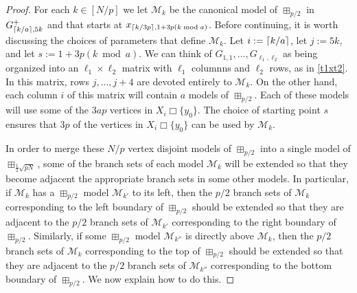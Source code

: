 \documentclass[12pt]{article}
\newcommand{\boxprod}{\mathbin{\Box}}
\DeclarePairedDelimiter{\ceil}{\lceil}{\rceil}
\renewcommand{\emptyset}{\varnothing}
\renewcommand{\le}{\leqslant}
\theoremstyle{plain}
\theoremstyle{definition}
\begin{document}
\begin{proof}
  For each $k\in[N/p]$ we let $\mathcal{M}_k$ be the canonical model of $\boxplus_{p/2}$ in $G_{\ceil{k/a},5k}^+$ and that starts at $x_{\ceil{k/3p},1+3p(k\bmod a)}$.  Before continuing, it is worth discussing the choices of parameters that define $\mathcal{M}_k$.  Let $i:=\ceil{k/a}$, let $j:=5k$, and let $s:=1+3p(k\bmod a)$.  We can think of $G_{1,1},\ldots,G_{\ell_1,\ell_2}$ as being organized into an $\ell_1\times \ell_2$ matrix with $\ell_1$ columnns and $\ell_2$ rows, as in \cref{t1xt2}.  In this matrix, rows $j,\ldots,j+4$ are devoted entirely to $\mathcal{M}_{k}$.  On the other hand, each column $i$ of this matrix will contain $a$ models of $\boxplus_{p/2}$.  Each of these models will use some of the $3ap$ vertices in $X_i\boxprod\{y_0\}$.  The choice of starting point $s$ ensures that $3p$ of the vertices in $X_i\boxprod\{y_0\}$ can be used by $\mathcal{M}_k$.


  In order to merge these $N/p$ vertex disjoint models of $\boxplus_{p/2}$ into a single model of $\boxplus_{\tfrac 12\sqrt{pN}}$, some of the branch sets of each model $\mathcal{M}_k$ will be extended so that they become adjacent the appropriate branch sets in some other models.  In particular, if $\mathcal{M}_k$ has a $\boxplus_{p/2}$ model $\mathcal{M}_{k'}$ to its left, then the $p/2$ branch sets of $\mathcal{M}_k$ corresponding to the left boundary of $\boxplus_{p/2}$ should be extended so that they are adjacent to the $p/2$ branch sets of $\mathcal{M}_{k'}$ corresponding to the right boundary of $\boxplus_{p/2}$.  Similarly, if some $\boxplus_{p/2}$ model $\mathcal{M}_{k''}$ is directly above $\mathcal{M}_k$, then the $p/2$ branch sets of $\mathcal{M}_k$ corresponding to the top of $\boxplus_{p/2}$ should be extended so that they are adjacent to the $p/2$ branch sets of $\mathcal{M}_{k''}$ corresponding to the bottom boundary of $\boxplus_{p/2}$.  We now explain how to do this.


\end{proof}
\end{document}
